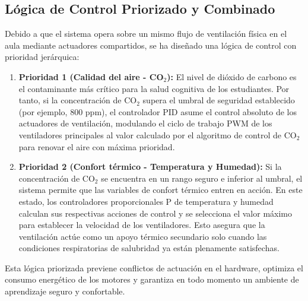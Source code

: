 \subsection{Lógica de Control Priorizado y Combinado}
Debido a que el sistema opera sobre un mismo flujo de ventilación física en el aula mediante actuadores compartidos, se ha diseñado una lógica de control con prioridad jerárquica:

\begin{enumerate}
	\item \textbf{Prioridad 1 (Calidad del aire - CO\(_2\)):} El nivel de dióxido de carbono es el contaminante más crítico para la salud cognitiva de los estudiantes. Por tanto, si la concentración de CO\(_2\) supera el umbral de seguridad establecido (por ejemplo, 800 ppm), el controlador PID asume el control absoluto de los actuadores de ventilación, modulando el ciclo de trabajo PWM de los ventiladores principales al valor calculado por el algoritmo de control de CO\(_2\) para renovar el aire con máxima prioridad.
	\item \textbf{Prioridad 2 (Confort térmico - Temperatura y Humedad):} Si la concentración de CO\(_2\) se encuentra en un rango seguro e inferior al umbral, el sistema permite que las variables de confort térmico entren en acción. En este estado, los controladores proporcionales P de temperatura y humedad calculan sus respectivas acciones de control y se selecciona el valor máximo para establecer la velocidad de los ventiladores. Esto asegura que la ventilación actúe como un apoyo térmico secundario solo cuando las condiciones respiratorias de salubridad ya están plenamente satisfechas.
\end{enumerate}

Esta lógica priorizada previene conflictos de actuación en el hardware, optimiza el consumo energético de los motores y garantiza en todo momento un ambiente de aprendizaje seguro y confortable.

